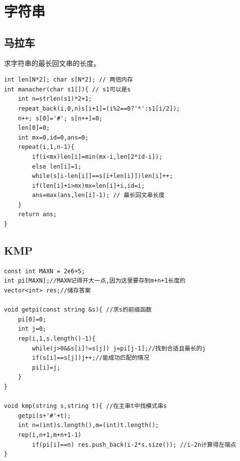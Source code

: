 \documentclass[a4]{ctexart}
\begin{document}
\section{字符串}

\subsection{马拉车}
求字符串的最长回文串的长度。
\begin{lstlisting}
int len[N*2]; char s[N*2]; // 两倍内存
int manacher(char s1[]){ // s1可以是s
	int n=strlen(s1)*2+1;
	repeat_back(i,0,n)s[i+1]=(i%2==0?'*':s1[i/2]);
	n++; s[0]='#'; s[n++]=0;
	len[0]=0;
	int mx=0,id=0,ans=0;
	repeat(i,1,n-1){
		if(i<mx)len[i]=min(mx-i,len[2*id-i]);
		else len[i]=1;
		while(s[i-len[i]]==s[i+len[i]])len[i]++;
		if(len[i]+i>mx)mx=len[i]+i,id=i;
		ans=max(ans,len[i]-1); // 最长回文串长度
	}
	return ans;
}
\end{lstlisting}
\newpage
\subsection{KMP}
\begin{lstlisting}
const int MAXN = 2e6+5;
int pi[MAXN];//MAXN记得开大一点,因为这里要存到m+n+1长度的 
vector<int> res;//储存答案
 
void getpi(const string &s){ //求s的前缀函数
	pi[0]=0;
	int j=0;
	rep(i,1,s.length()-1){
		while(j>0&&s[i]!=s[j]) j=pi[j-1];//找到合适且最长的j 
		if(s[i]==s[j])j++;//能成功匹配的情况 
		pi[i]=j;
	}
}

void kmp(string s,string t){ //在主串t中找模式串s 
	getpi(s+'#'+t);
	int n=(int)s.length(),m=(int)t.length();
	rep(i,n+1,m+n+1-1)
		if(pi[i]==n) res.push_back(i-2*s.size()); //i-2n计算得左端点 
}
\end{lstlisting}
\end{document}
